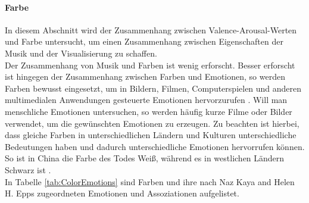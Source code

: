 \documentclass[11pt,a4paper]{article}
\begin{document}
\paragraph{Farbe}
In diesem Abschnitt wird der Zusammenhang zwischen Valence-Arousal-Werten und Farbe untersucht, um einen Zusammenhang zwischen Eigenschaften der Musik und der Visualisierung zu schaffen.\\
Der Zusammenhang von Musik und Farben ist wenig erforscht. Besser erforscht ist hingegen der Zusammenhang zwischen Farben und Emotionen, so werden Farben bewusst eingesetzt, um in Bildern, Filmen, Computerspielen und anderen multimedialen Anwendungen gesteuerte Emotionen hervorzurufen \cite{10.3389/fpsyg.2017.00440}. Will man menschliche Emotionen untersuchen, so werden häufig kurze Filme oder Bilder verwendet, um die gewünschten Emotionen zu erzeugen. Zu beachten ist hierbei, dass gleiche Farben in unterschiedlichen Ländern und Kulturen unterschiedliche Bedeutungen haben und dadurch unterschiedliche Emotionen hervorrufen können. So ist in China die Farbe des Todes Weiß, während es in westlichen Ländern Schwarz ist  \cite[S. 3]{c0f471f7e6a618d880cf25175c9f99ac97ef8ba7d016c7f8c523f8d902892d9e}.\\
In Tabelle \ref{tab:ColorEmotions} sind Farben und ihre nach Naz Kaya and Helen H. Epps
 \cite{c0f471f7e6a618d880cf25175c9f99ac97ef8ba7d016c7f8c523f8d902892d9e} zugeordneten Emotionen und Assoziationen aufgelistet.
\end{document}
